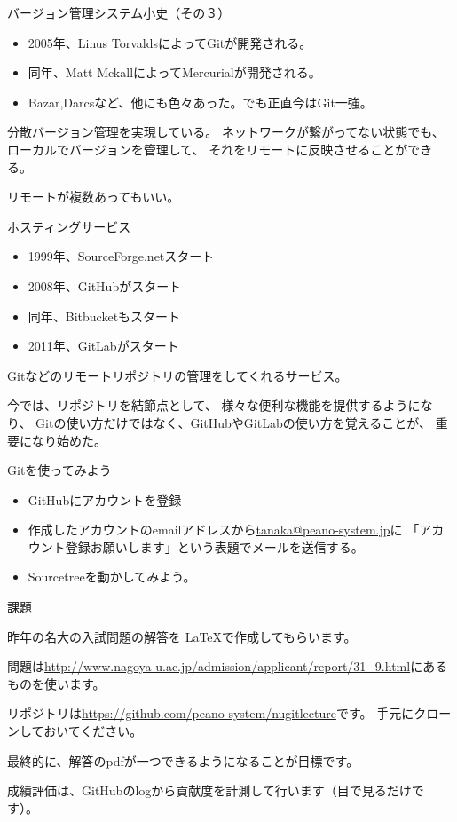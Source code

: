 \documentclass[12pt, unicode]{beamer}
\begin{document}
\begin{frame}{バージョン管理システム小史（その３）}
\begin{itemize}
\item 2005年、Linus TorvaldsによってGitが開発される。
\item 同年、Matt MckallによってMercurialが開発される。
\item Bazar,Darcsなど、他にも色々あった。でも正直今はGit一強。
\end{itemize}

分散バージョン管理を実現している。
ネットワークが繋がってない状態でも、
ローカルでバージョンを管理して、
それをリモートに反映させることができる。

リモートが複数あってもいい。

\end{frame}
\begin{frame}{ホスティングサービス}
\begin{itemize}
\item 1999年、SourceForge.netスタート
\item 2008年、GitHubがスタート
\item 同年、Bitbucketもスタート
\item 2011年、GitLabがスタート
\end{itemize}

Gitなどのリモートリポジトリの管理をしてくれるサービス。

今では、リポジトリを結節点として、
様々な便利な機能を提供するようになり、
Gitの使い方だけではなく、GitHubやGitLabの使い方を覚えることが、
重要になり始めた。


\end{frame}
\begin{frame}{Gitを使ってみよう}

\begin{itemize}
\item GitHubにアカウントを登録
\item 作成したアカウントのemailアドレスから\url{tanaka@peano-system.jp}に
「アカウント登録お願いします」という表題でメールを送信する。
\item Sourcetreeを動かしてみよう。
\end{itemize}

\end{frame}
\begin{frame}{課題}

昨年の名大の入試問題の解答を \LaTeX で作成してもらいます。

問題は\url{http://www.nagoya-u.ac.jp/admission/applicant/report/31_9.html}にあるものを使います。

リポジトリは\url{https://github.com/peano-system/nugitlecture}です。
手元にクローンしておいてください。

最終的に、解答のpdfが一つできるようになることが目標です。

成績評価は、GitHubのlogから貢献度を計測して行います（目で見るだけです）。

\end{frame}
\end{document}
